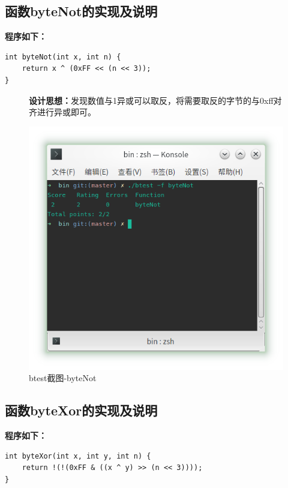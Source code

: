 \subsection{函数byteNot的实现及说明}

\textbf{程序如下：}
\begin{verbatim}
int byteNot(int x, int n) {
    return x ^ (0xFF << (n << 3));
}
\end{verbatim}

\begin{figure}[H]
\begin{minipage}[c]{0.5\linewidth}
\textbf{设计思想：}发现数值与1异或可以取反，将需要取反的字节的与0xff对齐进行异或即可。    
\end{minipage}
\begin{minipage}[c]{0.4\linewidth}
\centering
\includegraphics[width=0.9\linewidth]{figures/byteNot}
\caption{btest截图-byteNot}
\label{fig:byteNote}
\end{minipage}
\end{figure}

\subsection{函数byteXor的实现及说明}

\textbf{程序如下：}
\begin{verbatim}
int byteXor(int x, int y, int n) {
    return !(!(0xFF & ((x ^ y) >> (n << 3))));
}
\end{verbatim}

